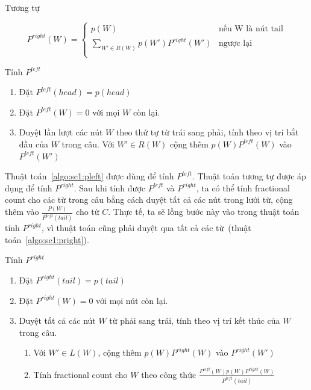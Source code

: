 \documentclass[a4paper,oneside,14pt]{extbook} %
\begin{document}
Tương tự

$$
P^{right}(W) = \left\{
    \begin{array}{ll}
      p(W)&\text{nếu W là nút tail}\\
      \displaystyle\sum_{W' \in R(W)}p(W')P^{right}(W')&\text{ngược lại}\\
    \end{array}
  \right.
$$

\begin{algo}\caption{Tính $P^{left}$}
\label{algo:sc1:pleft}
\begin{enumerate}
\item Đặt $P^{left}(head) = p(head)$
\item Đặt $P^{left}(W) = 0$ với mọi $W$ còn lại.
\item Duyệt lần lượt các nút $W$ theo thứ tự từ trái sang phải, tính
  theo vị trí bắt đầu của $W$ trong câu. Với $W' \in R(W)$
  cộng thêm $p(W)P^{left}(W)$ vào $P^{left}(W')$
\end{enumerate}
\end{algo}

Thuật toán~\ref{algo:sc1:pleft} được dùng để tính $P^{left}$. Thuật
toán tương tự được áp dụng để tính $P^{right}$.  Sau khi tính được
$P^{left}$ và $P^{right}$, ta có thể tính fractional 
count cho các từ trong câu bằng cách duyệt tất cả các nút trong lưới từ,
cộng thêm vào $\displaystyle\frac{P(W)}{P^{left}(tail)}$ cho từ
$C$. Thực tế, ta sẽ lồng bước này vào trong thuật toán tính
$P^{right}$, vì thuật toán cũng phải duyệt qua tất cả các từ~(thuật
toán~\ref{algo:sc1:pright}). 

\begin{algo}\caption{Tính $P^{right}$}
\label{algo:sc1:pright}
\begin{enumerate}
\item Đặt $P^{right}(tail) = p(tail)$
\item Đặt $P^{right}(W) = 0$ với mọi nút còn lại.
\item Duyệt tất cả các nút $W$ từ phải sang trái, tính theo vị trí kết
  thúc của $W$ trong câu.
  \begin{enumerate}
  \item Với $W' \in L(W)$, cộng thêm $p(W)P^{right}(W)$ vào
    $P^{right}(W')$
  \item Tính fractional count cho $W$ theo công thức
    $\displaystyle\frac{P^{left}(W)p(W)P^{right}(W)}{P^{left}(tail)}$
  \end{enumerate}
\end{enumerate}
\end{algo}
\end{document}

